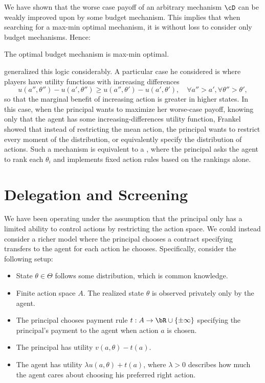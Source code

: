 We have shown that the worse case payoff of an arbitrary mechanism \(\cD\) can be weakly improved upon by some budget mechanism.
This implies that when searching for a max-min optimal mechanism, it is without loss to consider only budget mechanisms.
Hence:
\begin{proposition}
  The optimal budget mechanism is max-min optimal.
\end{proposition}

\Textcite{frankel2014AlignedDelegation} generalized this logic considerably.
A particular case he considered is where players have utility functions with increasing differences
\[
  u(a'', \theta'') - u(a', \theta'')
  \geq u(a'', \theta') - u(a', \theta'), \quad \forall a'' > a', \forall \theta'' > \theta',
\]
so that the marginal benefit of increasing action is greater in higher states.
In this case, when the principal wants to maximize her worse-case payoff, knowing only that the agent has some increasing-differences utility function, Frankel showed that instead of restricting the mean action, the principal wants to restrict every moment of the distribution, or equivalently specify the distribution of actions.
Such a mechanism is equivalent to a , where the principal asks the agent to rank each \(\theta_i\) and implements fixed action rules based on the rankings alone.

\section{Delegation and Screening}
We have been operating under the assumption that the principal only has a limited ability to control actions by restricting the action space.
We could instead consider a richer model where the principal chooses a contract specifying transfers to the agent for each action he chooses.
Specifically, consider the following setup:
\begin{itemize}
  \item State \(\theta \in \Theta\) follows some distribution, which is common knowledge.
  \item Finite action space \(A\).
    The realized state \(\theta\) is observed privately only by the agent.
  \item The principal chooses payment rule \(t: A \to \bR \cup \{\pm \infty\}\) specifying the principal's payment to the agent when action \(a\) is chosen.
  \item The principal has utility \(v(a, \theta) - t(a)\).
  \item The agent has utility \(\lambda u(a, \theta) + t(a)\), where \(\lambda > 0\) describes how much the agent cares about choosing his preferred right action.
\end{itemize}

